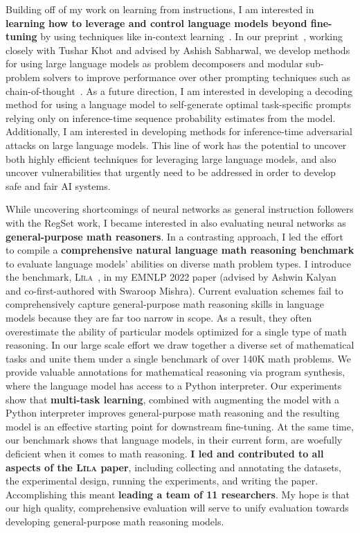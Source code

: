 \documentclass[11pt]{article}
\newcommand\lila{\textsc{L\={\i}la}\xspace}
\begin{document}
Building off of my work on learning from instructions, I am interested in
\textbf{learning how to leverage and control language models beyond fine-tuning}
by using techniques like in-context learning~\cite{Min2022RethinkingTR}.
In our preprint~\cite{Khot2022DecomposedPA},
working closely with Tushar Khot and advised by Ashish Sabharwal,
we develop methods for using large language models 
as problem decomposers and modular sub-problem solvers to improve performance over 
other prompting techniques such as chain-of-thought~\cite{Wei2022ChainOT}. 
As a future direction, I am interested in
developing a decoding method for using a language model 
to self-generate optimal task-specific prompts 
relying only on inference-time sequence probability estimates from the model.
Additionally, I am interested in developing methods 
for inference-time adversarial attacks on large language models. 
This line of work has the potential to uncover both highly efficient 
techniques for leveraging large language models,
and also uncover vulnerabilities that urgently need to be addressed 
in order to develop safe and fair AI systems.


While uncovering shortcomings of neural networks as general instruction followers with the RegSet work,
I became interested in also evaluating neural networks as 
\textbf{general-purpose math reasoners}.
In a contrasting approach,
I led the effort to compile a
\textbf{comprehensive natural language math reasoning benchmark} 
to evaluate language models' abilities on diverse 
math problem types.
I introduce the benchmark, \lila~\cite{Mishra2022Lila}, 
in my EMNLP 2022 paper 
(advised by Ashwin Kalyan and co-first-authored with Swaroop Mishra).
Current evaluation schemes fail to comprehensively capture 
general-purpose math reasoning skills in language models
because they are far too narrow in scope. 
As a result, they often overestimate the ability 
of particular models optimized for a single type of math reasoning.
In our large scale effort we draw together a diverse set of mathematical tasks 
and unite them under a single benchmark of over 140K math problems.
We provide valuable annotations for mathematical reasoning via program synthesis, 
where the language model has access to a Python interpreter.
Our experiments show that \textbf{multi-task learning}, 
combined with augmenting the model with a Python interpreter
improves general-purpose math reasoning
and the resulting model is an effective starting point 
for downstream fine-tuning. 
At the same time, our benchmark shows that language models, 
in their current form, 
are woefully deficient when it comes to math reasoning.
\textbf{I led and contributed to all aspects of the \lila paper},
including collecting and annotating the datasets,
the experimental design, running the experiments, and writing the paper.
Accomplishing this meant \textbf{leading a team of 11 researchers}.
My hope is that our high quality, comprehensive evaluation  
will serve to unify evaluation
towards developing general-purpose math reasoning models.
\end{document}
